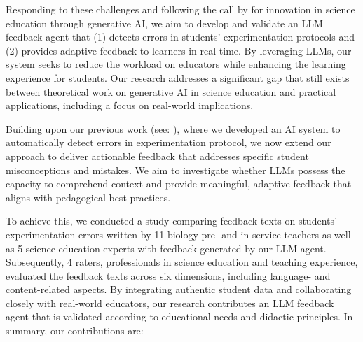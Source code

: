 Responding to these challenges and following the call by \citet{zhai2023ai} for innovation in science education through generative AI, we aim to develop and validate an LLM feedback agent that (1) detects errors in students' experimentation protocols and (2) provides adaptive feedback to learners in real-time. By leveraging LLMs, our system seeks to reduce the workload on educators while enhancing the learning experience for students. Our research addresses a significant gap that still exists between theoretical work on generative AI in science education and practical applications, including a focus on real-world implications.

Building upon our previous work (see: \citet{bewersdorff2023assessing}), where we developed an AI system to automatically detect errors in experimentation protocol, we now extend our approach to deliver actionable feedback that addresses specific student misconceptions and mistakes. We aim to investigate whether LLMs possess the capacity to comprehend context and provide meaningful, adaptive feedback that aligns with pedagogical best practices.

To achieve this, we conducted a study comparing feedback texts on students' experimentation errors written by 11 biology pre- and in-service teachers as well as 5 science education experts  with feedback generated by our LLM agent. Subsequently, 4 raters, professionals in science education and teaching experience, evaluated the feedback texts across six dimensions, including language- and content-related aspects.
%
By integrating authentic student data and collaborating closely with real-world educators, our research contributes an LLM feedback agent that is validated according to educational needs and didactic principles. 
%
%
In summary, our contributions are:

